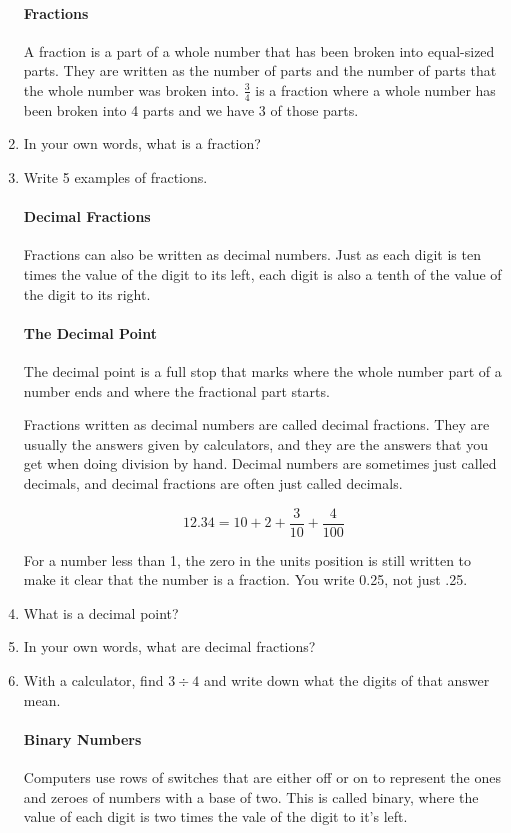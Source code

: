 \documentclass[12pt]{article}
\begin{document}
\begin{enumerate}
\paragraph{Fractions}
A fraction is a part of a whole number that has been broken into equal-sized parts. They are written as the number of parts and the number of parts that the whole number was broken into. $\frac{3}{4}$ is a fraction where a whole number has been broken into 4 parts and we have 3 of those parts.

\item In your own words, what is a fraction?
\item Write 5 examples of fractions.

\paragraph{Decimal Fractions}
Fractions can also be written as decimal numbers. Just as each digit is ten times the value of the digit to its left, each digit is also a tenth of the value of the digit to its right.

\paragraph{The Decimal Point}
The decimal point is a full stop that marks where the whole number part of a number ends and where the fractional part starts.

Fractions written as decimal numbers are called decimal fractions. They are usually the answers given by calculators, and they are the answers that you get when doing division by hand. Decimal numbers are sometimes just called decimals, and decimal fractions are often just called decimals.

$$12.34 = 10 + 2 + \frac{3}{10} + \frac{4}{100}$$

For a number less than 1, the zero in the units position is still written to make it clear that the number is a fraction. You write 0.25, not just .25.

\item What is a decimal point?
\item In your own words, what are decimal fractions?
\item With a calculator, find $3 \div 4$ and write down what the digits of that answer mean.

\paragraph{Binary Numbers}
Computers use rows of switches that are either off or on to represent the ones and zeroes of numbers with a base of two. This is called binary, where the value of each digit is two times the vale of the digit to it’s left.\\


\end{enumerate}
\end{document}
